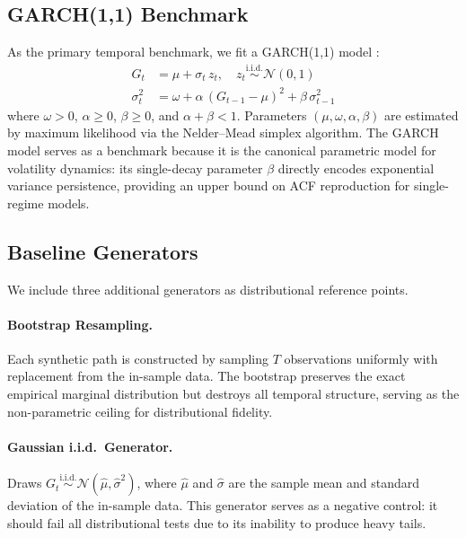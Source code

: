 \subsection{GARCH(1,1) Benchmark}
\label{sec:garch}

As the primary temporal benchmark, we fit a GARCH(1,1) model \cite{bollerslev1986generalized}:
\begin{align}
    G_t &= \mu + \sigma_t\, z_t, \quad z_t \overset{\text{i.i.d.}}{\sim} \mathcal{N}(0,1) \label{eq:garch_mean} \\
    \sigma_t^2 &= \omega + \alpha\, (G_{t-1} - \mu)^2 + \beta\, \sigma_{t-1}^2 \label{eq:garch_var}
\end{align}
where $\omega > 0$, $\alpha \geq 0$, $\beta \geq 0$, and $\alpha + \beta < 1$.
Parameters $(\mu, \omega, \alpha, \beta)$ are estimated by maximum likelihood via the Nelder--Mead simplex algorithm.
The GARCH model serves as a benchmark because it is the canonical parametric model for volatility dynamics: its single-decay parameter $\beta$ directly encodes exponential variance persistence, providing an upper bound on ACF reproduction for single-regime models.

\subsection{Baseline Generators}
\label{sec:baselines}

We include three additional generators as distributional reference points.

\paragraph{Bootstrap Resampling.}
Each synthetic path is constructed by sampling $T$ observations uniformly with replacement from the in-sample data.
The bootstrap preserves the exact empirical marginal distribution but destroys all temporal structure, serving as the non-parametric ceiling for distributional fidelity.

\paragraph{Gaussian i.i.d.\ Generator.}
Draws $G_t \overset{\text{i.i.d.}}{\sim} \mathcal{N}(\hat{\mu}, \hat{\sigma}^2)$, where $\hat{\mu}$ and $\hat{\sigma}$ are the sample mean and standard deviation of the in-sample data.
This generator serves as a negative control: it should fail all distributional tests due to its inability to produce heavy tails.

